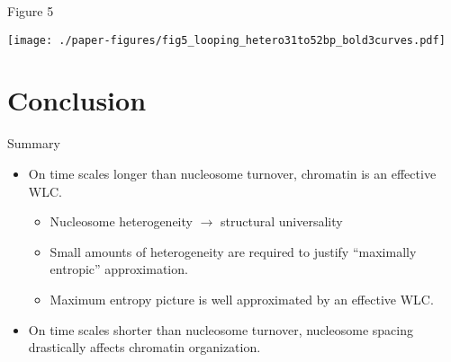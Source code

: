 \documentclass[10pt]{beamer}
\begin{document}
\begin{frame}{Figure 5}
    \begin{center}
        \texttt{[image: ./paper-figures/fig5\_looping\_hetero31to52bp\_bold3curves.pdf]}
    \end{center}
\end{frame}

    \section{Conclusion}

\begin{frame}{Summary}
    \begin{itemize}[<+->]
        \item On time scales longer than nucleosome turnover, chromatin is an
            effective WLC.\@
        \begin{itemize}[<+->]
            \item Nucleosome heterogeneity $\to$ structural universality
            \item Small amounts of heterogeneity are required to justify ``maximally
                entropic'' approximation.
            \item Maximum entropy picture is well approximated by an effective
                WLC.\@
        \end{itemize}
        \item On time scales shorter than nucleosome turnover, nucleosome
            spacing drastically affects chromatin organization.
    \end{itemize}
\end{frame}

%     
%     

{\1
\begin{frame}
\end{frame}}
\end{document}
